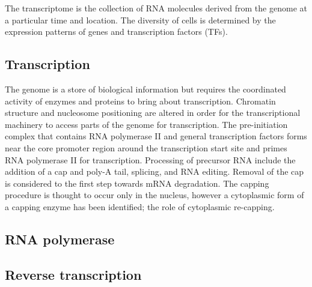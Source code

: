 The transcriptome is the collection of RNA molecules derived from the genome at a particular time and location. The diversity of cells is determined by the expression patterns of genes and transcription factors (TFs).

\subsection{Transcription}

The genome is a store of biological information but requires the coordinated activity of enzymes and proteins to bring about transcription. Chromatin structure and nucleosome positioning are altered in order for the transcriptional machinery to access parts of the genome for transcription. The pre-initiation complex that contains RNA polymerase II and general transcription factors forms near the core promoter region around the transcription start site and primes RNA polymerase II for transcription. Processing of precursor RNA include the addition of a cap and poly-A tail, splicing, and RNA editing. Removal of the cap is considered to the first step towards mRNA degradation. The capping procedure is thought to occur only in the nucleus, however a cytoplasmic form of a capping enzyme has been identified; the role of cytoplasmic re-capping.

\subsection{RNA polymerase}

\subsection{Reverse transcription}

